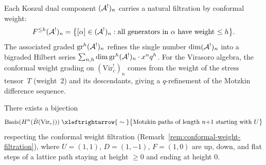 \begin{remark}\label{rem:conformal-weight-filtration}
Each Koszul dual component $(\mathcal{A}^!)_n$ carries a natural filtration by conformal weight:
\[
F^{\leq h} (\mathcal{A}^!)_n = \bigl\{[\alpha] \in (\mathcal{A}^!)_n :
\text{all generators in $\alpha$ have weight $\leq h$}\bigr\}.
\]
The associated graded $\operatorname{gr}^h (\mathcal{A}^!)_n$ refines the single number
$\dim (\mathcal{A}^!)_n$ into a bigraded Hilbert series
$\sum_{n,h} \dim \operatorname{gr}^h (\mathcal{A}^!)_n \cdot x^n q^h$.
For the Virasoro algebra, the conformal weight grading on
$(\mathrm{Vir}_c^!)_n$ comes from the weight of the stress tensor~$T$
(weight~$2$) and its descendants, giving a $q$-refinement of the
Motzkin difference sequence.
\end{remark}

\begin{theorem}
\label{thm:motzkin-path-model}
There exists a bijection
\begin{equation}\label{eq:motzkin-bijection}
\operatorname{Basis}(H^n(\bar{B}(\mathrm{Vir}_c)))
\;\xleftrightarrow{\;\sim\;}
\bigl\{\text{Motzkin paths of length $n{+}1$ starting with $U$}\bigr\}
\end{equation}
respecting the conformal weight filtration
\textup{(}Remark~\textup{\ref{rem:conformal-weight-filtration})},
where $U = (1,1)$, $D = (1,-1)$, $F = (1,0)$
are up, down, and flat steps of a lattice path staying
at height $\geq 0$ and ending at height $0$.
\end{theorem}

